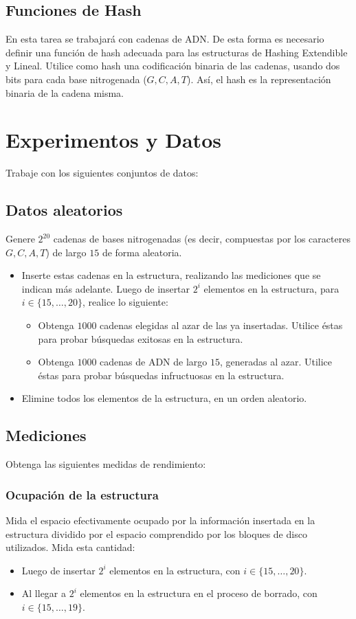 \documentclass[dcc,uchile]{fcfmcourse}
\begin{document}
\subsection*{Funciones de Hash}
En esta tarea se trabajará con cadenas de ADN. De esta forma es necesario definir una función de hash adecuada para las estructuras de Hashing Extendible y Lineal. Utilice como hash una codificación binaria de las cadenas, usando dos bits para cada base nitrogenada ($G, C, A, T$). Así, el hash es la representación binaria de la cadena misma.

\section{Experimentos y Datos}
Trabaje con los siguientes conjuntos de datos:

\subsection*{Datos aleatorios}
Genere $2^{20}$ cadenas de bases nitrogenadas (es decir, compuestas por los caracteres $G, C, A, T$) de largo $15$ de forma aleatoria.
\begin{itemize}
    \item Inserte estas cadenas en la estructura, realizando las mediciones que se indican más adelante. Luego de insertar $2^i$ elementos en la estructura, para $i \in \{15, \ldots, 20\}$, realice lo siguiente:
    \begin{itemize}
        \item Obtenga $1000$ cadenas elegidas al azar de las ya insertadas. Utilice éstas para probar búsquedas exitosas en la estructura.
        \item Obtenga $1000$ cadenas de ADN de largo $15$, generadas al azar. Utilice éstas para probar búsquedas infructuosas en la estructura.
    \end{itemize}
    \item Elimine todos los elementos de la estructura, en un orden aleatorio.
\end{itemize}

\subsection*{Mediciones}
Obtenga las siguientes medidas de rendimiento:

\subsubsection*{Ocupación de la estructura}
Mida el espacio efectivamente ocupado por la información insertada en la estructura dividido por el espacio comprendido por los bloques de disco utilizados. Mida esta cantidad:
\begin{itemize}
    \item Luego de insertar $2^i$ elementos en la estructura, con $i\in \{15,\ldots,20\}$.
    \item Al llegar a $2^i$ elementos en la estructura en el proceso de borrado, con $i\in \{15,\ldots,19\}$.
\end{itemize}
\end{document}
